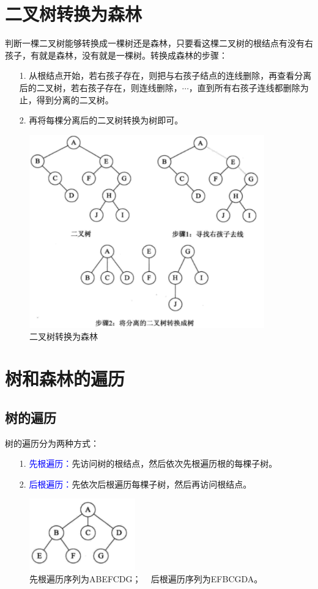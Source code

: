 \documentclass[10pt]{article}
\newcommand{\blue}{\textcolor{blue}}
\begin{document}
\section{二叉树转换为森林}
判断一棵二叉树能够转换成一棵树还是森林，只要看这棵二叉树的根结点有没有右孩子，有就是森林，没有就是一棵树。转换成森林的步骤：
\begin{itemize}
\item[1.] 从根结点开始，若右孩子存在，则把与右孩子结点的连线删除，再查看分离后的二叉树，若右孩子存在，则连线删除，$\cdots$，直到所有右孩子连线都删除为止，得到分离的二叉树。 
\item[2.] 再将每棵分离后的二叉树转换为树即可。
\end{itemize}
\begin{figure}[htbp]
\centering
\includegraphics[width=4in]{fig/bitree2forest.pdf}
\caption{二叉树转换为森林}
\end{figure}

\section{树和森林的遍历}
\subsection{树的遍历}
树的遍历分为两种方式：
\begin{itemize}
\item[1.] \blue{先根遍历：}先访问树的根结点，然后依次先根遍历根的每棵子树。
\item[2.] \blue{后根遍历：}先依次后根遍历每棵子树，然后再访问根结点。
\end{itemize}

\begin{figure}[htbp]
\centering
\includegraphics[width=1.8in]{fig/tree.pdf}
\caption{先根遍历序列为ABEFCDG； ~
后根遍历序列为EFBCGDA。}
\end{figure}
\end{document}
